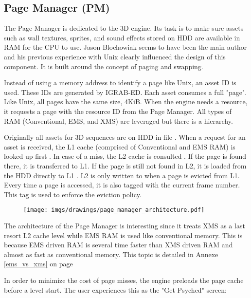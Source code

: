 \documentclass[book.tex]{subfiles}
\begin{document}
\subsection{Page Manager (PM)}
The Page Manager is dedicated to the 3D engine. Its task is to make sure assets such as wall textures, sprites, and sound effects stored on HDD are available in RAM for the CPU to use. Jason Blochowiak seems to have been the main author and his previous experience with Unix clearly influenced the design of this component. It is built around the concept of paging and swapping. \\
\par
Instead of using a memory address to identify a page like Unix, an asset ID is used. These IDs are generated by IGRAB-ED. Each asset consumes a full "page". Like Unix, all pages have the same size, 4KiB. When the engine needs a resource, it requests a page with the resource ID from the Page Manager. All types of RAM (Conventional, EMS, and XMS) are leveraged but there is a hierarchy.\\
\par
Originally all assets for 3D sequences are on HDD in file . When a request for an asset is received, the L1 cache (comprised of Conventional and EMS RAM) is looked up first . In case of a miss, the L2 cache is consulted . If the page is found there, it is transferred to L1. If the page is still not found in L2, it is loaded from the HDD directly to L1 . L2 is only written to when a page is evicted from L1. Every time a page is accessed, it is also tagged with the current frame number. This tag is used to enforce the eviction policy.
 \par
\begin{figure}[H]
\centering
 \texttt{[image: imgs/drawings/page\_manager\_architecture.pdf]}
 \end{figure}
 \par
 The architecture of the Page Manager is interesting since it treats XMS as a last resort L2 cache level while EMS RAM is used like conventional memory. This is because EMS driven RAM is several time faster than XMS driven RAM and almost as fast as conventional memory. This topic is detailed in Annexe \ref{ems_vs_xms} on page \pageref{ems_vs_xms}\\
 \par
In order to minimize the cost of page misses, the engine preloads the page cache before a level start. The user experiences this as the "Get Psyched" screen:
\end{document}
